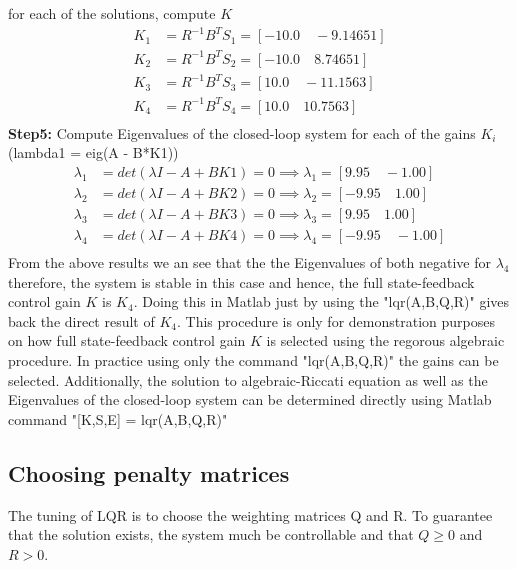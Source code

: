 for each of the solutions, compute $K$
\begin{align*}
	K_{1} &= R^{-1}B^{T}S_{1} = [-10.0 \quad -9.14651] \\
	K_{2} &= R^{-1}B^{T}S_{2} = [-10.0 \quad 8.74651] \\
	K_{3} &= R^{-1}B^{T}S_{3} = [10.0 \quad -11.1563] \\
	K_{4} &= R^{-1}B^{T}S_{4} = [10.0 \quad 10.7563] \\
\end{align*}
\textbf{Step5: }Compute Eigenvalues of the closed-loop system for each of the gains $K_{i}$ (lambda1 = eig(A - B*K1))
\begin{align*}
	\lambda_{1} &= det(\lambda I - A + B K1) = 0 \implies \lambda_{1} = [9.95 \quad -1.00] \\
	\lambda_{2} &= det(\lambda I - A + B K2) = 0 \implies \lambda_{2} = [-9.95 \quad 1.00] \\
	\lambda_{3} &= det(\lambda I - A + B K3) = 0 \implies \lambda_{3} = [9.95 \quad 1.00] \\
	\lambda_{4} &= det(\lambda I - A + B K4) = 0 \implies \lambda_{4} = [-9.95 \quad -1.00] \\
\end{align*}
From the above results we an see that the the Eigenvalues of both negative for $\lambda_{4}$ therefore, the system is stable in this case and hence, the full state-feedback control gain $K$ is $K_{4}$. Doing this in Matlab just by using the "lqr(A,B,Q,R)" gives back the direct result of $K_4$. This procedure is only for demonstration purposes on how full state-feedback control gain $K$ is selected using the regorous algebraic procedure. In practice using only the command "lqr(A,B,Q,R)" the gains can be selected. Additionally, the solution to algebraic-Riccati equation as well as the Eigenvalues of the closed-loop system can be determined directly using Matlab command "[K,S,E] = lqr(A,B,Q,R)"

\subsection{Choosing penalty matrices}

The tuning of LQR is to choose the weighting matrices Q and R. To guarantee that the solution exists, the system much be controllable and that $Q \geq 0$ and $R > 0$.

